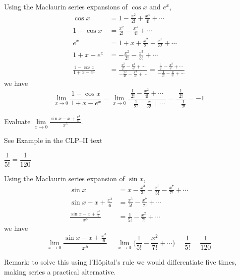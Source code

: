 \begin{solution}
Using the Maclaurin series expansions of $\cos x$ and $e^x$,
\begin{align*}
\cos x& = 1-\frac{x^2}{2!} +\frac{x^4}{4!} +\cdots \\
1-\cos x& = \frac{x^2}{2!} -\frac{x^4}{4!} +\cdots \\
e^x &= 1+x+ \frac{x^2}{2!} +\frac{x^3}{3!} +\cdots \\
1+x-e^x&=-\frac{x^2}{2!} -\frac{x^3}{3!} +\cdots \\
\frac{1-\cos x}{1+x-e^x}
&=\frac{\frac{x^2}{2!} -\frac{x^4}{4!} +\cdots }
        {-\frac{x^2}{2!} -\frac{x^3}{3!} +\cdots}
=\frac{\frac{1}{2!} -\frac{x^2}{4!} +\cdots }
        {-\frac{1}{2!} -\frac{x}{3!} +\cdots}
\end{align*}
we have
\begin{equation*}
\lim_{x\rightarrow 0}\frac{1-\cos x}{1+x-e^x}
=\lim_{x\rightarrow 0}\frac{\frac{1}{2!} -\frac{x^2}{4!} +\cdots }
        {-\frac{1}{2!} -\frac{x}{3!} +\cdots}
=\frac{\frac{1}{2!}} {-\frac{1}{2!}}
=-1
\end{equation*}
\end{solution}


\begin{Mquestion}[2012A]
Evaluate
$\displaystyle \lim\limits_{x\rightarrow 0}\frac{\sin x -x +\frac{x^3}{6}}{x^5}$.
\end{Mquestion}

\begin{hint}
See Example  in the
CLP--II text
\end{hint}

\begin{answer}
$\dfrac{1}{5!}=\dfrac{1}{120}$
\end{answer}

\begin{solution}
Using the Maclaurin series expansion of $\sin x$,
\begin{align*}
\sin x& = x-\frac{x^3}{3!} +\frac{x^5}{5!} -\frac{x^7}{7!} +\cdots \\
\sin x-x +\frac{x^3}{6} & = \frac{x^5}{5!}-\frac{x^7}{7!} +\cdots \\
\frac{\sin x -x +\frac{x^3}{6}}{x^5}
&=\frac{1}{5!}-\frac{x^2}{7!} +\cdots
\end{align*}
we have
\begin{equation*}
\lim_{x\rightarrow 0}\frac{\sin x -x +\frac{x^3}{6}}{x^5}
=\lim_{x\rightarrow 0}\Big(\frac{1}{5!}-\frac{x^2}{7!} +\cdots\Big)
=\frac{1}{5!}
=\frac{1}{120}
\end{equation*}

Remark: to solve this using l'H\^{o}pital's rule we would differentiate five times, making series a practical alternative.
\end{solution}


